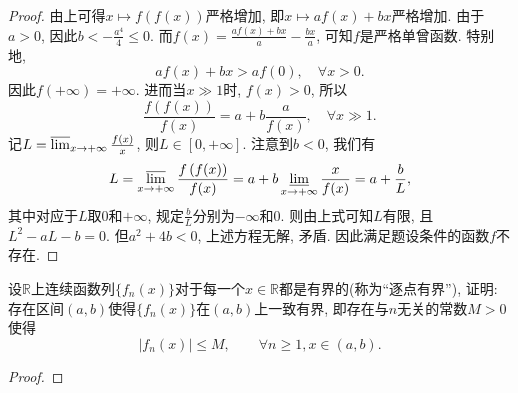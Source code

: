 \begin{quizb}
\begin{proof}
由上可得\(x\mapsto f\left(f(x)\right)\)严格增加, 即\(x\mapsto af(x)+bx\)严格增加. 由于\(a>0\), 因此\(b<-\frac{a^4}{4}\leqslant 0\). 而\(f(x)=\frac{af(x)+bx}{a}-\frac{bx}{a}\), 可知\(f\)是严格单曾函数. 特别地,\[af(x)+bx>af(0),\quad\forall x>0.\]因此\(f(+\infty)=+\infty\). 进而当\(x\gg 1\)时, \(f(x)>0\), 所以\[\frac{f\left(f(x)\right)}{f(x)}=a+b\frac{a}{f(x)},\quad \forall x\gg 1.\]记\(L=\varlimsup_{x\rightarrow+\infty}\frac{f(x)}{x}\), 则\(L\in[0,+\infty]\). 注意到\(b<0\), 我们有\[L=\varlimsup_{x\rightarrow+\infty}\frac{f\left(f(x)\right)}{f(x)}=a+b\varliminf_{x\rightarrow+\infty}\frac{x}{f(x)}=a+\frac{b}{L},\]其中对应于\(L\)取\(0\)和\(+\infty\), 规定\(\frac{b}{L}\)分别为\(-\infty\)和\(0\). 则由上式可知\(L\)有限, 且\(L^2-aL-b=0\). 但\(a^2+4b<0\), 上述方程无解, 矛盾. 因此满足题设条件的函数\(f\)不存在.
\end{proof}
\woe 设\(\mathbb{R}\)上连续函数列\(\{f_n(x)\}\)对于每一个\(x\in\mathbb{R}\)都是有界的(称为“逐点有界”), 证明: 存在区间\((a,b)\)使得\(\{f_n(x)\}\)在\((a,b)\)上一致有界, 即存在与\(n\)无关的常数\(M>0\)使得\[|f_n(x)|\leqslant M,\qquad \forall n\geqslant 1,x\in (a,b).\]
\begin{proof}
	

\end{proof}
\end{quizb}
